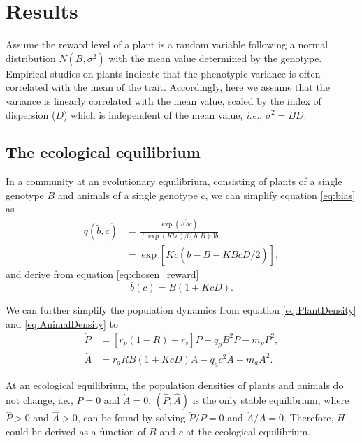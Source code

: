 \documentclass[12pt]{article}
\begin{document}
\section*{Results}

Assume the reward level of a plant is a random variable following a normal distribution $N(B, \sigma^2)$ with the mean value determined by the genotype. Empirical studies on plants indicate that the phenotypic variance is often correlated with the mean of the trait. Accordingly, here we assume that the variance is linearly correlated with the mean value, scaled by the index of dispersion ($D$) which is independent of the mean value, \textit{i.e.}, $\sigma^2=B D$. 

\subsection*{The ecological equilibrium}

In a community at an evolutionary equilibrium, consisting of plants of a single genotype $B$ and animals of a single genotype $c$, we can simplify equation \eqref{eq:bias} as
\begin{align*}
q(\tilde{b},c) &= \frac{\exp \left( K \tilde{b} c \right)}{\int \exp \left( K b c \right)  \beta(b, B) \mathrm{d}b} \\
			   &= \exp[K c(\tilde{b}-B-K B c D/2)],
\label{eq:qeqm}
\end{align*}
and derive from equation \eqref{eq:chosen_reward}
\begin{equation*}
\bar{b}(c)=B (1 + K c D).
\label{eq:bbar}
\end{equation*}

We can further simplify the population dynamics from equation \eqref{eq:PlantDensity} and \eqref{eq:AnimalDensity} to
\begin{subequations}
\begin{align}
\label{eq:totalPDensity}
\dot{P}&=\left[r_p (1-R) + r_s \right]P - q_p B^2 P - m_p P^2 , \\
\label{eq:totalADensity}
\dot{A}&=r_a R B (1+K c D) A - q_a c^2 A- m_a A^2.
\end{align}
\label{eq:EcoDynamics}
\end{subequations}

At an ecological equilibrium, the population densities of plants and animals do not change, i.e., $\dot{P}=0$ and $\dot{A}=0$. $(\hat{P},\hat{A})$ is the only stable equilibrium, where $\hat{P}>0$ and $\hat{A}>0$, can be found by solving $\dot{P}/P=0$ and $\dot{A}/A=0$. Therefore, $H$ could be derived as a function of $B$ and $c$ at the ecological equilibrium.
\end{document}
